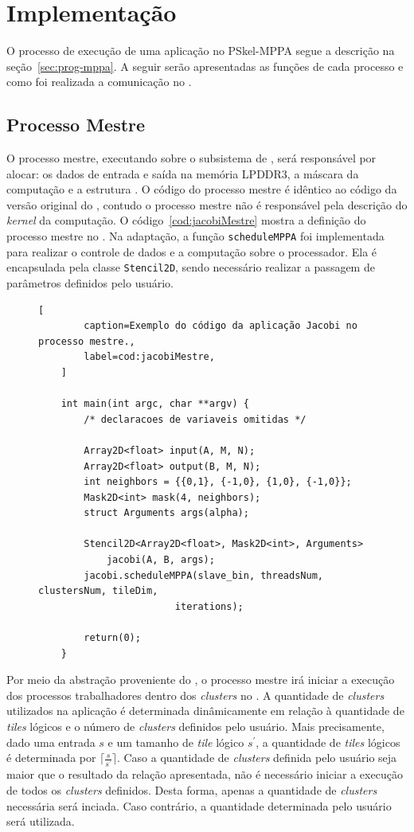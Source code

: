 \section{Implementação}
O processo de execução de uma aplicação no PSkel-MPPA segue a descrição na
seção~\ref{sec:prog-mppa}. A seguir serão apresentadas as funções de cada
processo e como foi realizada a comunicação no \mppa.

\subsection{Processo Mestre}
O processo mestre, executando sobre o subsistema de \es, será responsável por
alocar: os dados de entrada e saída na memória LPDDR3, a máscara da computação e
a estrutura \stencil. O código do processo mestre é idêntico ao código da versão
original do \pskel, contudo o processo mestre não é responsável pela descrição
do \textit{kernel} da computação. O código~\ref{cod:jacobiMestre} mostra a
definição do processo mestre no \mppa.  Na adaptação, a função
\texttt{scheduleMPPA} foi implementada para realizar o controle de dados e a
computação sobre o processador. Ela é encapsulada pela classe
\texttt{Stencil2D}, sendo necessário realizar a passagem de parâmetros definidos
pelo usuário.

\newlength\someheight
\setlength\someheight{3cm}

\begin{figure}[t]
	\begin{lstlisting}[
		caption=Exemplo do código da aplicação Jacobi no processo mestre.,
		label=cod:jacobiMestre,
	]

	int main(int argc, char **argv) {
		/* declaracoes de variaveis omitidas */

		Array2D<float> input(A, M, N);
		Array2D<float> output(B, M, N);
		int neighbors = {{0,1}, {-1,0}, {1,0}, {-1,0}};
		Mask2D<int> mask(4, neighbors);
		struct Arguments args(alpha);

		Stencil2D<Array2D<float>, Mask2D<int>, Arguments>
			jacobi(A, B, args);
		jacobi.scheduleMPPA(slave_bin, threadsNum, clustersNum, tileDim,
                        iterations);

		return(0);
	}
\end{lstlisting}
\end{figure}

Por meio da abstração proveniente do \pskel, o processo mestre irá iniciar a
execução dos processos trabalhadores dentro dos \textit{clusters} no \mppa. A
quantidade de \textit{clusters} utilizados na aplicação é determinada
dinâmicamente em relação à quantidade de \textit{tiles} lógicos e o número de
\textit{clusters} definidos pelo usuário.  Mais precisamente, dado uma entrada
$s$ e um tamanho de \textit{tile} lógico $s^\prime$, a quantidade de
\textit{tiles} lógicos é determinada por $\lceil\frac{s}{s^\prime}\rceil$. Caso
a quantidade de \textit{clusters} definida pelo usuário seja maior que o
resultado da relação apresentada, não é necessário iniciar a execução de todos
os \textit{clusters} definidos. Desta forma, apenas a quantidade de
\textit{clusters} necessária será inciada. Caso contrário, a quantidade
determinada pelo usuário será utilizada.


